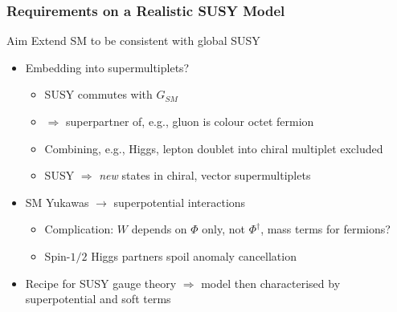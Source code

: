 \documentclass[10pt,aspectratio=169]{beamer}
\begin{document}
\begin{frame}
  \frametitle{Requirements on a Realistic SUSY Model}
  \begin{block}{Aim}
    Extend SM to be consistent with global SUSY
  \end{block}
  \begin{itemize}\itemsep1em
  \item Embedding into supermultiplets?
    \begin{itemize}\itemsep0.5em
    \item SUSY commutes with $G_{SM}$
    \item $\Rightarrow$ superpartner of, e.g., gluon is colour octet fermion
    \item Combining, e.g., Higgs, lepton doublet into chiral multiplet
      excluded
    \item \alert{SUSY $\Rightarrow$ \emph{new} states in chiral, vector
      supermultiplets}
    \end{itemize}
  \item SM Yukawas $\to$ superpotential interactions
    \begin{itemize}\itemsep0.5em
    \item Complication: $W$ depends on $\Phi$ only, not $\Phi^\dagger$,
      mass terms for fermions?
    \item Spin-$1/2$ Higgs partners spoil anomaly cancellation
    \end{itemize}
  \item Recipe for SUSY gauge theory $\Rightarrow$ {\color{blue} model then
    characterised by superpotential and soft terms}
  \end{itemize}
\end{frame}
\end{document}
